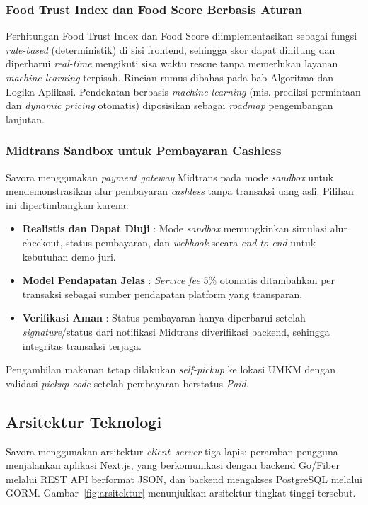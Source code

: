 \subsubsection{Food Trust Index dan Food Score Berbasis Aturan}
Perhitungan Food Trust Index dan Food Score diimplementasikan sebagai fungsi \textit{rule-based} (deterministik)
di sisi frontend, sehingga skor dapat dihitung dan diperbarui \textit{real-time} mengikuti sisa waktu
rescue tanpa memerlukan layanan \textit{machine learning} terpisah. Rincian rumus dibahas pada bab
Algoritma dan Logika Aplikasi. Pendekatan berbasis \textit{machine learning} (mis. prediksi permintaan
dan \textit{dynamic pricing} otomatis) diposisikan sebagai \textit{roadmap} pengembangan lanjutan.

\subsubsection{Midtrans Sandbox untuk Pembayaran Cashless}
Savora menggunakan \textit{payment gateway} Midtrans pada mode \textit{sandbox} untuk mendemonstrasikan
alur pembayaran \textit{cashless} \cite{midtrans2025docs} tanpa transaksi uang asli. Pilihan ini
dipertimbangkan karena:
\begin{itemize}[leftmargin=*]
    \item \textbf{Realistis dan Dapat Diuji} : Mode \textit{sandbox} memungkinkan simulasi alur checkout,
    status pembayaran, dan \textit{webhook} secara \textit{end-to-end} untuk kebutuhan demo juri.
    \item \textbf{Model Pendapatan Jelas} : \textit{Service fee} 5\% otomatis ditambahkan per transaksi
    sebagai sumber pendapatan platform yang transparan.
    \item \textbf{Verifikasi Aman} : Status pembayaran hanya diperbarui setelah \textit{signature}/status
    dari notifikasi Midtrans diverifikasi backend, sehingga integritas transaksi terjaga.
\end{itemize}
Pengambilan makanan tetap dilakukan \textit{self-pickup} ke lokasi UMKM dengan validasi \textit{pickup
code} setelah pembayaran berstatus \textit{Paid}.

\subsection{Arsitektur Teknologi}

Savora menggunakan arsitektur \textit{client--server} tiga lapis: peramban pengguna menjalankan
aplikasi Next.js, yang berkomunikasi dengan backend Go/Fiber melalui REST API berformat JSON, dan
backend mengakses PostgreSQL melalui GORM. Gambar~\ref{fig:arsitektur} menunjukkan arsitektur
tingkat tinggi tersebut.

